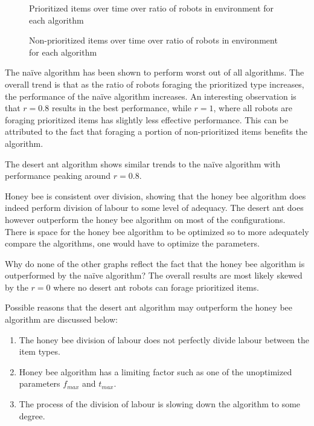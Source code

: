 
\begin{figure}[!htb]
\centering
\resizebox{\textwidth}{!}{}
\caption{Prioritized items over time over ratio of robots in environment for each algorithm }
\label{divisiongoldplot}
\end{figure}


\begin{figure}[!htb]
\centering
\resizebox{\textwidth}{!}{}
\caption{Non-prioritized items over time over ratio of robots in environment for each algorithm}
\label{divisionwasteplot}
\end{figure}

The na\"ive algorithm has been shown to perform worst out of all algorithms. The overall trend is that as the ratio of robots foraging the prioritized type increases, the performance of the na\"ive algorithm increases. An interesting observation is that $r=0.8$ results in the best performance, while $r=1$, where all robots are foraging prioritized items has slightly less effective performance. This can be attributed to the fact that foraging a portion of non-prioritized items benefits the algorithm.       

The desert ant algorithm shows similar trends to the na\"ive algorithm with performance peaking around $r=0.8$. 

Honey bee is consistent over division, showing that the honey bee algorithm does indeed perform division of labour to some level of adequacy. The desert ant does however outperform the honey bee algorithm on most of the configurations. There is space for the honey bee algorithm to be optimized so to more adequately compare the algorithms, one would have to optimize the parameters. 

Why do none of the other graphs reflect the fact that the honey bee algorithm is outperformed by the na\"ive algorithm? The overall results are most likely skewed by the $r=0$ where no desert ant robots can forage prioritized items. 

Possible reasons that the desert ant algorithm may outperform the honey bee algorithm are discussed below:
\begin{enumerate}
\item The honey bee division of labour does not perfectly divide labour between the item types.
\item Honey bee algorithm has a limiting factor such as one of the unoptimized parameters $f_{max}$ and $t_{max}$. 
\item The process of the division of labour is slowing down the algorithm to some degree.
\end{enumerate}

